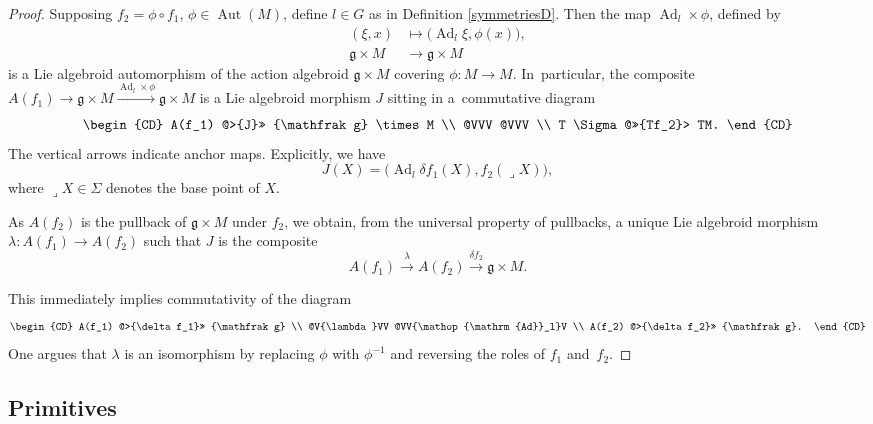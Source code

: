 \documentclass[10pt,a4paper]{amsart}
\numberwithin{equation}{section}
\DeclareMathOperator{\Adjoint}{Ad}
\DeclareMathOperator{\automorphism}{Aut}
\begin{document}
\begin{proof} Supposing $f_2 = \phi \circ f_1$, $\phi \in
\automorphism(M)$, define $l \in G$ as in Definition
\ref{symmetriesD}. Then the map $\Adjoint_l \times \phi $, defined by
 \begin{align*}
 (\xi,x) &\mapsto \big(\!\Adjoint_l \xi , \phi(x)\big),
 \\
{\mathfrak g} \times M &\rightarrow {\mathfrak g} \times M
 \end{align*}
 is a Lie algebroid automorphism of the action
algebroid ${\mathfrak g} \times M$ covering $\phi \colon M \rightarrow
M$. In~particular, the composite $A(f_1) \rightarrow {\mathfrak g}
\times M \xrightarrow{\Adjoint_l \times \phi} {\mathfrak g} \times M$
is a Lie algebroid morphism $J$ sitting in a~com\-mutative diagram
\begin{equation*}
 \begin{CD}
 A(f_1) @>{J}>> {\mathfrak g} \times M \\ @VVV @VVV \\
T \Sigma @>>{Tf_2}> TM.
 \end{CD}
\end{equation*}
The vertical arrows indicate anchor maps. Explicitly, we have
\[
J(X) = \big(\!\Adjoint_l \delta f_1 (X), f_2(\lrcorner X)\big),
\]
where $\lrcorner X \in \Sigma$ denotes the base point of $X$.

As $A(f_2)$ is the pullback of ${\mathfrak g} \times M$ under $f_2$,
we obtain, from the universal property of pullbacks, a unique Lie
algebroid morphism $\lambda \colon A(f_1) \rightarrow A(f_2)$ such
that $J $ is the composite
 \[
 A(f_1) \xrightarrow{\lambda} A(f_2) \xrightarrow{\delta f_2}
 {\mathfrak g} \times M.
 \]

This immediately implies commutativity of the diagram
\begin{equation*}
 \begin{CD} A(f_1) @>{\delta f_1}>> {\mathfrak g} \\
@V{\lambda}VV @VV{\Adjoint_l}V \\ A(f_2) @>{\delta f_2}>> {\mathfrak g}.
 \end{CD}
\end{equation*}
One argues that $\lambda$ is an isomorphism by
replacing $\phi $ with $\phi^{-1}$ and reversing the roles of $f_1$
and~$f_2$.
\end{proof}

\subsection*{Primitives}
\end{document}

